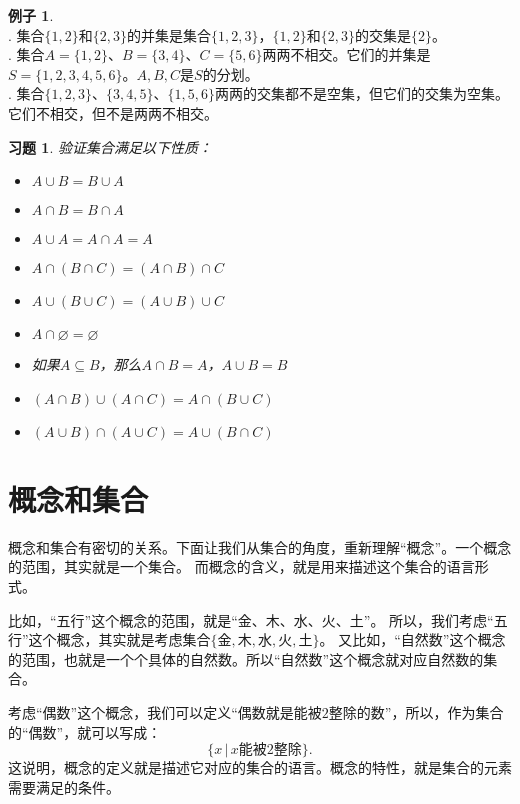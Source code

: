 \documentclass[12pt,UTF8]{ctexbook}
\theoremstyle{definition}
\newtheorem{ex}{例子}[section]
\theoremstyle{plain}
\newtheorem{xt}{习题}[section]
\begin{document}
\begin{ex}\label{ex:2-0-20}
    \mbox{} \\ 
    . 集合$\{1,2\}$和$\{2,3\}$的并集是集合$\{1,2,3\}$，$\{1,2\}$和$\{2,3\}$的交集是$\{2\}$。\\
    . 集合$A = \{1,2\}$、$B = \{3,4\}$、$C = \{5,6\}$两两不相交。它们的并集是$S = \{1,2,3,4,5,6\}$。$A,B,C$是$S$的分划。\\
    . 集合$ \{1,2,3\}$、$\{3,4,5\}$、$\{1,5,6\}$两两的交集都不是空集，但它们的交集为空集。它们不相交，但不是两两不相交。
\end{ex}

\begin{xt}\label{xt:2-1-0}
    验证集合满足以下性质：
    \begin{itemize}
        \item $A \cup B = B \cup A$
        \item $A \cap B = B \cap A$
        \item $A \cup A = A \cap A = A$
        \item $A \cap (B \cap C) = (A \cap B) \cap C$
        \item $A \cup (B \cup C) = (A \cup B) \cup C$
        \item $A \cap \varnothing = \varnothing$
        \item 如果$A \subseteq B$，那么$A \cap B = A$，$A \cup B = B$
        \item $(A \cap B) \cup (A \cap C) = A \cap (B \cup C)$
        \item $(A \cup B) \cap (A \cup C) = A \cup (B \cap C)$
    \end{itemize}  
\end{xt}

\section{概念和集合}

概念和集合有密切的关系。下面让我们从集合的角度，重新理解“概念”。一个概念的范围，其实就是一个集合。
而概念的含义，就是用来描述这个集合的语言形式。

比如，“五行”这个概念的范围，就是“金、木、水、火、土”。
所以，我们考虑“五行”这个概念，其实就是考虑集合$\{\mbox{金}, \mbox{木}, \mbox{水}, \mbox{火}, \mbox{土}\}$。
又比如，“自然数”这个概念的范围，也就是一个个具体的自然数。所以“自然数”这个概念就对应自然数的集合。

考虑“偶数”这个概念，我们可以定义“偶数就是能被$2$整除的数”，所以，作为集合的“偶数”，就可以写成：
$$ \{x \,|\,x \mbox{能被}2\mbox{整除} \}.$$
这说明，概念的定义就是描述它对应的集合的语言。概念的特性，就是集合的元素需要满足的条件。
\end{document}
